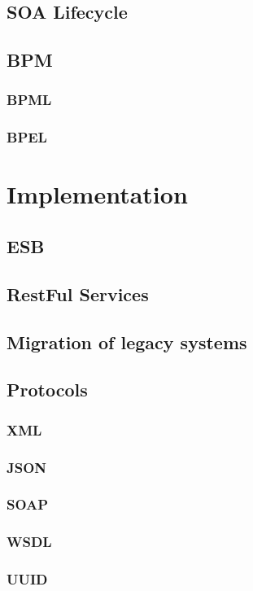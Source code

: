 \documentclass[12pt]{article}
\begin{document}
\subsection{SOA Lifecycle}
\subsection{BPM}
\subsubsection{BPML}
\subsubsection{BPEL}

\section{Implementation}
\subsection{ESB}
\label{sec:esb}
\subsection{RestFul Services}
\subsection{Migration of legacy systems}
\subsection{Protocols}
\subsubsection{XML}
\subsubsection{JSON}
\subsubsection{SOAP}
\subsubsection{WSDL}
\subsubsection{UUID}
\end{document}
